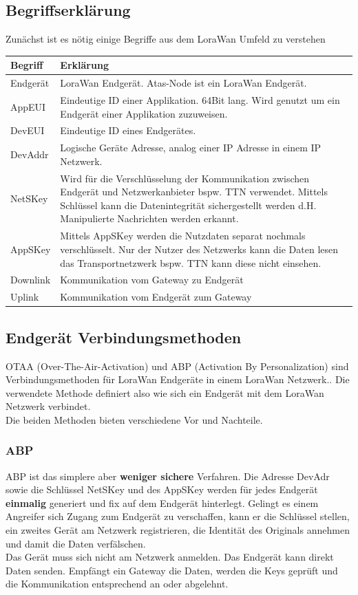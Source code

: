 \documentclass[11pt,english,german]{report}
\theoremstyle{definition}
\begin{document}
\subsection{Begriffserklärung}
Zunächst ist es nötig einige Begriffe aus dem LoraWan Umfeld zu verstehen\\[0.5cm]
\begin{tabularx}{\textwidth}{ l|X }
	\textbf{Begriff} & \textbf{Erklärung} \\ \hline
	Endgerät & LoraWan Endgerät. Atas-Node ist ein LoraWan Endgerät.\\ \hline
	AppEUI& Eindeutige ID einer Applikation. 64Bit lang. Wird genutzt um ein Endgerät einer Applikation zuzuweisen.\\ \hline
	DevEUI& Eindeutige ID eines Endgerätes. \\ \hline
	DevAddr & Logische Geräte Adresse, analog einer IP Adresse in einem IP Netzwerk.\\ \hline
	NetSKey & Wird für die Verschlüsselung der Kommunikation zwischen Endgerät und Netzwerkanbieter bspw. TTN verwendet. Mittels Schlüssel kann die Datenintegrität sichergestellt werden d.H. Manipulierte Nachrichten werden erkannt.\\ \hline
	AppSKey & Mittels AppSKey werden die Nutzdaten separat nochmals verschlüsselt. Nur der Nutzer des Netzwerks kann die Daten lesen das Transportnetzwerk bspw. TTN kann diese nicht einsehen.\cite{ttnsecurity}\\ \hline
	Downlink & Kommunikation vom Gateway zu Endgerät\\ \hline
	Uplink & Kommunikation vom Endgerät zum Gateway
\end{tabularx}

\newpage
\subsection{Endgerät Verbindungsmethoden}
OTAA (Over-The-Air-Activation) und ABP (Activation By Personalization) sind Verbindungsmethoden für LoraWan Endgeräte in einem LoraWan Netzwerk.\cite{jaguar}. Die verwendete Methode definiert also wie sich ein Endgerät mit dem LoraWan Netzwerk verbindet. \\[0.3cm]
Die beiden Methoden bieten verschiedene Vor und Nachteile.

\subsubsection{ABP}
ABP ist das simplere aber \textbf{weniger sichere} Verfahren. Die Adresse DevAdr sowie die Schlüssel NetSKey und des AppSKey werden für jedes Endgerät \textbf{einmalig} generiert und fix auf dem Endgerät hinterlegt. Gelingt es einem Angreifer sich Zugang zum Endgerät zu verschaffen, kann er die Schlüssel stellen, ein zweites Gerät am Netzwerk registrieren, die Identität des Originals annehmen und damit die Daten verfälschen.\\[0.3cm]
Das Gerät muss sich nicht am Netzwerk anmelden. Das Endgerät kann direkt Daten senden. Empfängt ein Gateway die Daten, werden die Keys geprüft und die Kommunikation entsprechend an oder abgelehnt.
\end{document}
